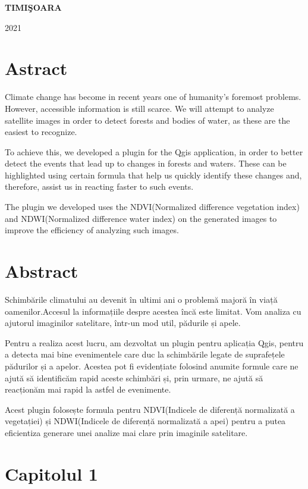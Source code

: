 \documentclass[12pt,a4paper]{article}
\theoremstyle{definition}
\theoremstyle{remark}
\begin{document}
\vfill
\begin{center}
{\bf TIMI\c SOARA

2021}
\end{center}
\newpage
\section*{\bf Astract}

Climate change has become in recent years one of humanity's foremost problems. However, accessible information is still scarce. We will attempt
 to analyze satellite images in order to detect forests and bodies of water, as these are the easiest to recognize.
 
 
 To achieve this, we developed a plugin for the Qgis application, in order to better detect the events that lead up to changes in forests and waters.
 These can be highlighted using certain formula that help us quickly identify these changes and, therefore, assist us in reacting faster to such events.
 
 
 The plugin we developed uses the NDVI(Normalized difference vegetation index) and NDWI(Normalized difference water index) on the generated images to improve the efficiency
 of analyzing such images.
 
 \newpage
 \section*{Abstract}
 
Schimbările climatului au devenit în ultimi ani o problemă majoră în viață oamenilor.Accesul la informațiile despre acestea încă este limitat.
Vom analiza cu ajutorul imaginilor satelitare, într-un mod util, pădurile și apele.

Pentru a realiza acest lucru, am dezvoltat un plugin pentru aplicația Qgis, pentru a detecta mai bine evenimentele care duc la schimbările legate de suprafețele  pădurilor și a apelor. Acestea pot fi evidențiate folosind anumite formule care ne ajută să identificăm rapid aceste schimbări și, prin urmare, ne ajută să reacționăm mai rapid la astfel de evenimente.


Acest plugin folosește formula pentru NDVI(Indicele de diferență normalizată a vegetației) și NDWI(Indicele de diferență normalizată a apei) pentru a putea  eficientiza generare unei analize mai clare prin imaginile satelitare.
\markright{}
\newpage
\normalsize{}
\tableofcontents
\newpage
\section*{\bf Capitolul 1}
\markright{}
\end{document}
